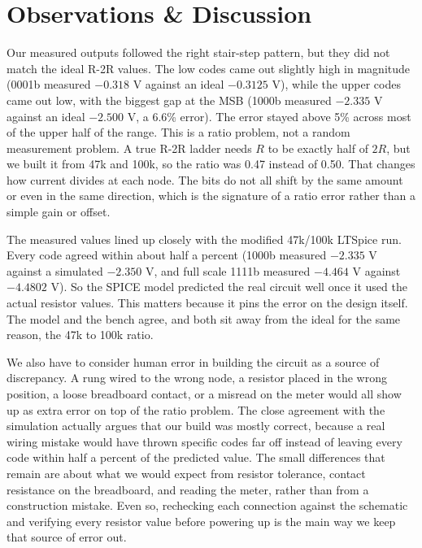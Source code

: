 \documentclass[11pt]{article}
\begin{document}
\section*{Observations \& Discussion}


Our measured outputs followed the right stair-step pattern, but they did not match the ideal R-2R values. The low codes came out slightly high in magnitude (0001b measured $-0.318$ V against an ideal $-0.3125$ V), while the upper codes came out low, with the biggest gap at the MSB (1000b measured $-2.335$ V against an ideal $-2.500$ V, a 6.6\% error). The error stayed above 5\% across most of the upper half of the range. This is a ratio problem, not a random measurement problem. A true R-2R ladder needs $R$ to be exactly half of $2R$, but we built it from 47k and 100k, so the ratio was 0.47 instead of 0.50. That changes how current divides at each node. The bits do not all shift by the same amount or even in the same direction, which is the signature of a ratio error rather than a simple gain or offset.
 
The measured values lined up closely with the modified 47k/100k LTSpice run. Every code agreed within about half a percent (1000b measured $-2.335$ V against a simulated $-2.350$ V, and full scale 1111b measured $-4.464$ V against $-4.4802$ V). So the SPICE model predicted the real circuit well once it used the actual resistor values. This matters because it pins the error on the design itself. The model and the bench agree, and both sit away from the ideal for the same reason, the 47k to 100k ratio.
 
We also have to consider human error in building the circuit as a source of discrepancy. A rung wired to the wrong node, a resistor placed in the wrong position, a loose breadboard contact, or a misread on the meter would all show up as extra error on top of the ratio problem. The close agreement with the simulation actually argues that our build was mostly correct, because a real wiring mistake would have thrown specific codes far off instead of leaving every code within half a percent of the predicted value. The small differences that remain are about what we would expect from resistor tolerance, contact resistance on the breadboard, and reading the meter, rather than from a construction mistake. Even so, rechecking each connection against the schematic and verifying every resistor value before powering up is the main way we keep that source of error out.
 
\end{document}
